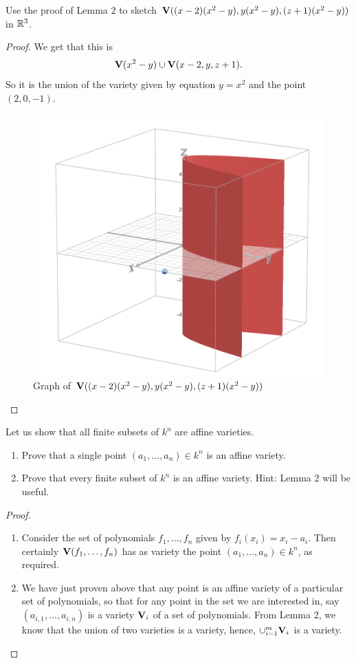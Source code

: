 \begin{exercise}{5}
Use the proof of Lemma $2$ to sketch $\mathbf{V}( (x-2)(x^2 - y), y(x^2 - y), (z+1)(x^2-y))$ in $\mathbb{R}^3$.
\end{exercise}
\begin{proof}
    We get that this is
    $$\mathbf{V}(x^2 - y)\cup \mathbf{V}(x-2, y, z+1).$$
    So it is the union of the variety given by equation $y=x^2$ and the point $(2,0,-1)$.
    \begin{figure}
        \centering
        \includegraphics[width=0.5\linewidth]{cox-little-oshea/assets/sec1-2-ex5.png}
            \caption{Graph of $\mathbf{V}( (x-2)(x^2 - y), y(x^2 - y), (z+1)(x^2-y))$}
            \label{fig:sec1-2-ex5}
    \end{figure}
\end{proof}

\begin{exercise}{6}
Let us show that all finite subsets of $k^n$ are affine varieties.
\begin{enumerate}
    \item Prove that a single point $(a_1,\dots,a_n)\in k^n$ is an affine variety.
    \item Prove that every finite subset of $k^n$ is an affine variety. Hint: Lemma 2 will be useful.
\end{enumerate}
\end{exercise}
\begin{proof}
 \begin{enumerate}
     \item Consider the set of polynomials $f_1,\dots,f_n$ given by $f_i(x_i)=x_i-a_i$. Then certainly $\mathbf{V}(f_1,\dots,f_n)$ has as variety the point $(a_1,\dots,a_n)\in k^n$, as required.
     \item We have just proven above that any point is an affine variety of a particular set of polynomials, so that for any point in the set we are interested in, say $(a_{i,1},\dots,a_{i,n})$ is a variety $\mathbf{V}_i$ of a set of polynomials. From Lemma 2, we know that the union of two varieties is a variety, hence, $\cup_{i=1}^{m}\mathbf{V}_i$ is a variety.
 \end{enumerate}
\end{proof}

